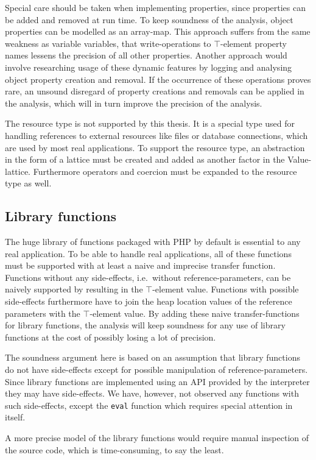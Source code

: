 Special care should be taken when implementing properties, since properties can be added and removed at run time. To keep soundness of the analysis, object properties can be modelled as an array-map. This approach suffers from the same weakness as variable variables, that write-operations to $\top$-element property names lessens the precision of all other properties. Another approach would involve researching usage of these dynamic features by logging and analysing object property creation and removal. If the occurrence of these operations proves rare, an unsound disregard of property creations and removals can be applied in the analysis, which will in turn improve the precision of the analysis.

The resource type is not supported by this thesis. It is a special type used for handling references to external resources like files or database connections, which are used by most real applications. To support the resource type, an abstraction in the form of a lattice must be created and added as another factor in the Value-lattice. Furthermore operators and coercion must be expanded to the resource type as well.

\subsection{Library functions}
The huge library of functions packaged with PHP by default is essential to any real application. To be able to handle real applications, all of these functions must be supported with at least a naive and imprecise transfer function. Functions without any side-effects, i.e.\ without reference-parameters, can be naively supported by resulting in the $\top$-element value. Functions with possible side-effects furthermore have to join the heap location values of the reference parameters with the $\top$-element value. By adding these naive transfer-functions for library functions, the analysis will keep soundness for any use of library functions at the cost of possibly losing a lot of precision. 

The soundness argument here is based on an assumption that library functions do not have side-effects except for possible manipulation of reference-parameters. Since library functions are implemented using an API provided by the interpreter they may have side-effects. We have, however, not observed any functions with such side-effects, except the \texttt{eval} function which requires special attention in itself. 

A more precise model of the library functions would require manual inspection of the source code, which is time-consuming, to say the least.

